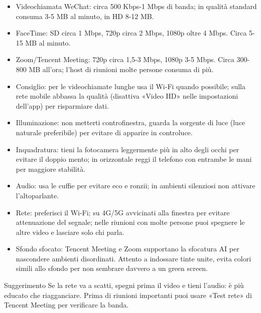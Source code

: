 
\begin{itemize}
  \item Videochiamata WeChat: circa 500 Kbps-1 Mbps di banda; in qualità standard consuma 3-5 MB al minuto, in HD 8-12 MB.
  \item FaceTime: SD circa 1 Mbps, 720p circa 2 Mbps, 1080p oltre 4 Mbps. Circa 5-15 MB al minuto.
  \item Zoom/Tencent Meeting: 720p circa 1,5-3 Mbps, 1080p 3-5 Mbps. Circa 300-800 MB all'ora; l'host di riunioni molte persone consuma di più.
  \item Consiglio: per le videochiamate lunghe usa il Wi-Fi quando possibile; sulla rete mobile abbassa la qualità (disattiva «Video HD» nelle impostazioni dell'app) per risparmiare dati.
\end{itemize}


\begin{itemize}
  \item Illuminazione: non metterti controfinestra, guarda la sorgente di luce (luce naturale preferibile) per evitare di apparire in controluce.
  \item Inquadratura: tieni la fotocamera leggermente più in alto degli occhi per evitare il doppio mento; in orizzontale reggi il telefono con entrambe le mani per maggiore stabilità.
  \item Audio: usa le cuffie per evitare eco e ronzii; in ambienti silenziosi non attivare l'altoparlante.
  \item Rete: preferisci il Wi-Fi; su 4G/5G avvicinati alla finestra per evitare attenuazione del segnale; nelle riunioni con molte persone puoi spegnere le altre video e lasciare solo chi parla.
  \item Sfondo sfocato: Tencent Meeting e Zoom supportano la sfocatura AI per nascondere ambienti disordinati. Attento a indossare tinte unite, evita colori simili allo sfondo per non sembrare davvero a un green screen.
\end{itemize}

\begin{tcbinfo}{Suggerimento}
Se la rete va a scatti, spegni prima il video e tieni l'audio: è più educato che riagganciare. Prima di riunioni importanti puoi usare «Test rete» di Tencent Meeting per verificare la banda.

\end{tcbinfo}

